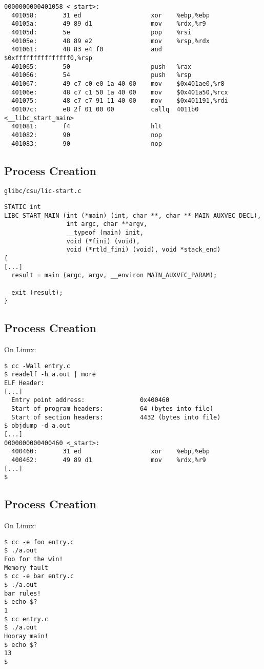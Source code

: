 \documentclass[xga]{xdvislides}
\begin{document}
\begin{verbatim}
0000000000401058 <_start>:
  401058:       31 ed                   xor    %ebp,%ebp
  40105a:       49 89 d1                mov    %rdx,%r9
  40105d:       5e                      pop    %rsi
  40105e:       48 89 e2                mov    %rsp,%rdx
  401061:       48 83 e4 f0             and    $0xfffffffffffffff0,%rsp
  401065:       50                      push   %rax
  401066:       54                      push   %rsp
  401067:       49 c7 c0 e0 1a 40 00    mov    $0x401ae0,%r8
  40106e:       48 c7 c1 50 1a 40 00    mov    $0x401a50,%rcx
  401075:       48 c7 c7 91 11 40 00    mov    $0x401191,%rdi
  40107c:       e8 2f 01 00 00          callq  4011b0 <__libc_start_main>
  401081:       f4                      hlt
  401082:       90                      nop
  401083:       90                      nop
\end{verbatim}

\subsection{Process Creation}
\verb+glibc/csu/lic-start.c+

\begin{verbatim}
STATIC int
LIBC_START_MAIN (int (*main) (int, char **, char ** MAIN_AUXVEC_DECL),
                 int argc, char **argv,
                 __typeof (main) init,
                 void (*fini) (void),
                 void (*rtld_fini) (void), void *stack_end)
{
[...]
  result = main (argc, argv, __environ MAIN_AUXVEC_PARAM);

  exit (result);
}
\end{verbatim}

\subsection{Process Creation}
On Linux:
\begin{verbatim}
$ cc -Wall entry.c
$ readelf -h a.out | more
ELF Header:
[...]
  Entry point address:               0x400460
  Start of program headers:          64 (bytes into file)
  Start of section headers:          4432 (bytes into file)
$ objdump -d a.out
[...]
0000000000400460 <_start>:
  400460:       31 ed                   xor    %ebp,%ebp
  400462:       49 89 d1                mov    %rdx,%r9
[...]
$
\end{verbatim}




\subsection{Process Creation}
On Linux:
\begin{verbatim}
$ cc -e foo entry.c
$ ./a.out
Foo for the win!
Memory fault
$ cc -e bar entry.c
$ ./a.out
bar rules!
$ echo $?
1
$ cc entry.c
$ ./a.out
Hooray main!
$ echo $?
13
$
\end{verbatim}
\end{document}
